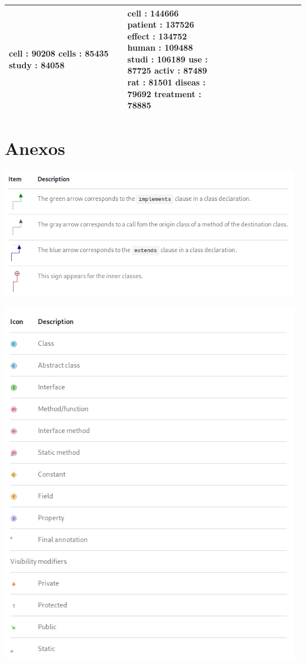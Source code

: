 \documentclass[12pt]{article}
\begin{document}
\begin{tabular}{| p{0.4\linewidth} | p{0.3\linewidth} | p{0.3\linewidth} |}
      cell : 90208 \newline
     cells : 85435 \newline
     study : 84058
     &
      cell : 144666 \newline
   patient : 137526 \newline
    effect : 134752 \newline
     human : 109488 \newline
     studi : 106189 \newline
       use : 87725 \newline
     activ : 87489 \newline
       rat : 81501 \newline
    diseas : 79692 \newline
 treatment : 78885
     \\
    \hline
\end{tabular}
\newpage

\section{Anexos}

\includegraphics[width=13cm]{arrow_legend.png}

\includegraphics[width=13cm]{icons_legend.png}
\end{document}
